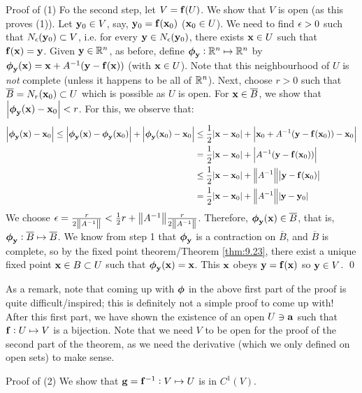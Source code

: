 \begin{nblank}{Proof of (1)}
    Fo the second step, let $V = \mathbf{f}(U)$. We show that $V$ is open (as this proves (1)). Let $\mathbf{y}_0 \in V$, say, $\mathbf{y}_0 = \mathbf{f}(\mathbf{x}_0)$ ($\mathbf{x}_0 \in U$). We need to find $\epsilon > 0$ such that $N_\epsilon(\mathbf{y}_0) \subset V$, i.e. for every $\mathbf{y} \in N_\epsilon(\mathbf{y}_0)$, there exists $\mathbf{x} \in U$ such that $\mathbf{f}(\mathbf{x}) = \mathbf{y}$. Given $\mathbf{y} \in \mathbb{R}^n$, as before, define $\mbox{\boldmath$ \phi $}_{\mathbf{y}}: \mathbb{R}^n \mapsto \mathbb{R}^n$ by $\mbox{\boldmath$ \phi $}_{\mathbf{y}}(\mathbf{x}) = \mathbf{x} + A^{-1}(\mathbf{y} - \mathbf{f}(\mathbf{x}))$ (with $\mathbf{x} \in U$). Note that this neighbourhood of $U$ is \emph{not} complete (unless it happens to be all of $\mathbb{R}^n$). Next, choose $r > 0$ such that $\overline{B} = N_r(\mathbf{x}_0) \subset U$ which is possible as $U$ is open. For $\mathbf{x} \in \overline{B}$, we show that $\abs{\mbox{\boldmath$ \phi $}_{\mathbf{y}}(\mathbf{x}) - \mathbf{x}_0} < r$. For this, we observe that:
    \begin{align*}
        \abs{\mbox{\boldmath$ \phi $}_{\mathbf{y}}(\mathbf{x}) - \mathbf{x}_0} \leq \abs{\mbox{\boldmath$ \phi $}_{\mathbf{y}}(\mathbf{x}) - \mbox{\boldmath$ \phi $}_{\mathbf{y}}(\mathbf{x}_0)} + \abs{\mbox{\boldmath$ \phi $}_{\mathbf{y}}(\mathbf{x}_0) - \mathbf{x}_0}
        &\leq \frac{1}{2}\abs{\mathbf{x} - \mathbf{x}_0} + \abs{\mathbf{x}_0 + A^{-1}(\mathbf{y} - \mathbf{f}(\mathbf{x}_0)) - \mathbf{x}_0}
        \\ &= \frac{1}{2}\abs{\mathbf{x} - \mathbf{x}_0} + \abs{A^{-1}(\mathbf{y} - \mathbf{f}(\mathbf{x}_0))}
        \\ &\leq \frac{1}{2}\abs{\mathbf{x} - \mathbf{x}_0} + \norm{A^{-1}}\abs{\mathbf{y} - \mathbf{f}(\mathbf{x}_0)}
        \\ &= \frac{1}{2}\abs{\mathbf{x} - \mathbf{x}_0} + \norm{A^{-1}}\abs{\mathbf{y} - \mathbf{y}_0}
    \end{align*}
    We choose $\epsilon = \frac{r}{2\norm{A^{-1}}} < \frac{1}{2}r + \norm{A^{-1}}\frac{r}{2\norm{A^{-1}}}$. Therefore, $\mbox{\boldmath$ \phi $}_{\mathbf{y}}(\mathbf{x}) \in \overline{B}$, that is, $\mbox{\boldmath$ \phi $}_{\mathbf{y}}: \overline{B} \mapsto \overline{B}$. We know from step 1 that $\mbox{\boldmath$ \phi $}_{\mathbf{y}}$ is a contraction on $\overline{B}$, and $\overline{B}$ is complete, so by the fixed point theorem/Theorem \ref{thm:9.23}, there exist a unique fixed point $\mathbf{x} \in B \subset U$ such that $\mbox{\boldmath$ \phi $}_{\mathbf{y}}(\mathbf{x}) = \mathbf{x}$. This $\mathbf{x}$ obeys $\mathbf{y} = \mathbf{f}(\mathbf{x})$ so $\mathbf{y} \in V$. \qed
\end{nblank}

\noindent As a remark, note that coming up with $\mbox{\boldmath$ \phi $}$ in the above first part of the proof is quite difficult/inspired; this is definitely not a simple proof to come up with! After this first part, we have shown the existence of an open $U \ni \mathbf{a}$ such that $\mathbf{f}: U \mapsto V$ is a bijection. Note that we need $V$ to be open for the proof of the second part of the theorem, as we need the derivative (which we only defined on open sets) to make sense.

\begin{nblank}{Proof of (2)}
    We show that $\mathbf{g} = \mathbf{f}^{-1}: V \mapsto U$ is in $C^1(V)$.
\end{nblank}